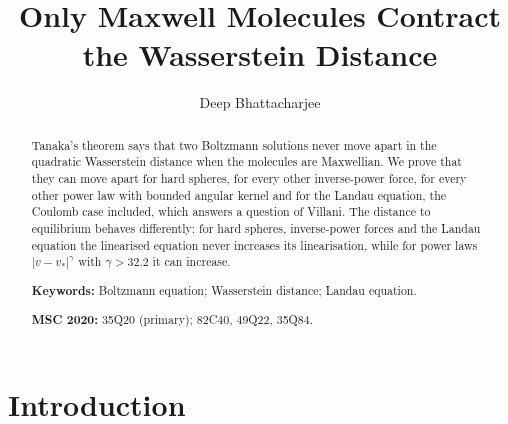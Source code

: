 \documentclass[11pt]{amsart}
\theoremstyle{definition}
\begin{document}
\title[Only Maxwell molecules contract $W_2$]{Only Maxwell Molecules Contract the Wasserstein Distance}

\author{Deep Bhattacharjee}
\address{Formerly, Electro-Gravitational Space Propulsion Laboratory (EGSPL), Bhubaneswar, Odisha 751030, India}
\address{Formerly, University of Calcutta (Heramba Chandra College), 23/49 Gariahat Road, Golpark, Kolkata 700029, West Bengal, India}

\begin{abstract}
Tanaka's theorem says that two Boltzmann solutions never move apart in the quadratic Wasserstein distance when the molecules are Maxwellian. We prove that they can move apart for hard spheres, for every other inverse-power force, for every other power law with bounded angular kernel and for the Landau equation, the Coulomb case included, which answers a question of Villani. The distance to equilibrium behaves differently: for hard spheres, inverse-power forces and the Landau equation the linearised equation never increases its linearisation, while for power laws $|v-v_*|^\gamma$ with $\gamma>32.2$ it can increase.

\medskip\noindent\textbf{Keywords:} Boltzmann equation; Wasserstein distance; Landau equation.

\smallskip\noindent\textbf{MSC 2020:} 35Q20 (primary); 82C40, 49Q22, 35Q84.
\end{abstract}

\maketitle

\section{Introduction}\label{sec:intro}
\end{document}
